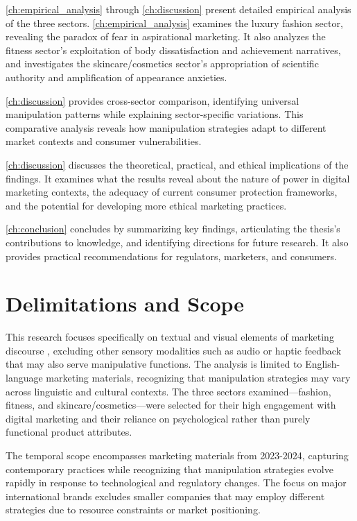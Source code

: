 \autoref{ch:empirical_analysis} through \autoref{ch:discussion} present detailed empirical analysis of the three sectors. \autoref{ch:empirical_analysis} examines the luxury fashion sector, revealing the paradox of fear in aspirational marketing. It also analyzes the fitness sector's exploitation of body dissatisfaction and achievement narratives, and investigates the skincare/cosmetics sector's appropriation of scientific authority and amplification of appearance anxieties.

\autoref{ch:discussion} provides cross-sector comparison, identifying universal manipulation patterns while explaining sector-specific variations. This comparative analysis reveals how manipulation strategies adapt to different market contexts and consumer vulnerabilities.

\autoref{ch:discussion} discusses the theoretical, practical, and ethical implications of the findings. It examines what the results reveal about the nature of power in digital marketing contexts, the adequacy of current consumer protection frameworks, and the potential for developing more ethical marketing practices.

\autoref{ch:conclusion} concludes by summarizing key findings, articulating the thesis's contributions to knowledge, and identifying directions for future research. It also provides practical recommendations for regulators, marketers, and consumers.

\section{Delimitations and Scope}
\label{sec:delimitations}

This research focuses specifically on textual and visual elements of marketing discourse \cite{fairclough2015language}, excluding other sensory modalities such as audio or haptic feedback that may also serve manipulative functions. The analysis is limited to English-language marketing materials, recognizing that manipulation strategies may vary across linguistic and cultural contexts. The three sectors examined—fashion, fitness, and skincare/cosmetics—were selected for their high engagement with digital marketing and their reliance on psychological rather than purely functional product attributes.

The temporal scope encompasses marketing materials from 2023-2024, capturing contemporary practices while recognizing that manipulation strategies evolve rapidly in response to technological and regulatory changes. The focus on major international brands excludes smaller companies that may employ different strategies due to resource constraints or market positioning.

